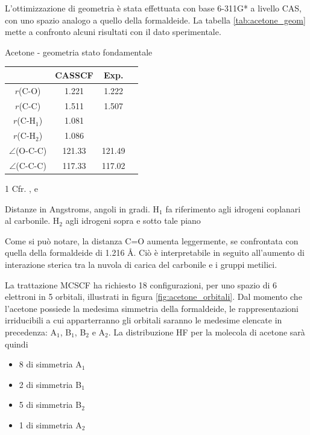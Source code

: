 L'ottimizzazione di geometria \`e stata effettuata con base 6-311G* a livello CAS,
con uno spazio analogo a quello della formaldeide. La tabella \ref{tab:acetone_geom}
mette a confronto alcuni risultati con il dato sperimentale.
\begin{center}
\begin{threeparttable}
\caption{Acetone - geometria stato fondamentale}
\label{tab:acetone_geom}
\small
\begin{tabular}{|ccc|c|}
\hline
							& CASSCF	& Exp.\tnote{1} \\ 
\hline
$r$(C-O)\tnote{2}			& 1.221		& 1.222				\\
$r$(C-C)\tnote{2}			& 1.511		& 1.507				 \\
$r$(C-H$_1$)\tnote{3}			& 1.081		&			 		 \\
$r$(C-H$_2$)\tnote{3}			& 1.086		&				 	 \\
$\angle$(O-C-C)				& 121.33	& 121.49			 \\
$\angle$(C-C-C)				& 117.33	& 117.02			 \\
\hline
\end{tabular}
\begin{tablenotes}
\parbox[h]{6cm}{
\small
 \item[1] Cfr. \cite{jms-550-551-2000-281}, \cite{jms-120-1986-118} e
 \cite{mp-31-1976-1377}
 \item[] Distanze in Angstroms, angoli in gradi. H$_1$ fa riferimento agli
         idrogeni coplanari al carbonile. H$_2$ agli idrogeni sopra e sotto tale
         piano
}
\end{tablenotes}
\end{threeparttable}
\end{center}
Come si pu\`o notare, la distanza C=O aumenta leggermente, se confrontata
con quella della formaldeide di 1.216 \AA. Ci\`o \`e interpretabile in seguito
all'aumento di interazione sterica tra la nuvola di carica del carbonile e i
gruppi metilici.

La trattazione MCSCF ha richiesto
18 configurazioni, per uno spazio di 6 elettroni in 5 orbitali, illustrati
in figura \ref{fig:acetone_orbitali}. Dal momento che l'acetone possiede la
medesima simmetria della formaldeide, le rappresentazioni irriducibili a cui
apparterranno gli orbitali saranno le medesime elencate in precedenza: A$_1$, B$_1$,
B$_2$ e A$_2$. La distribuzione HF per la molecola di acetone sar\`a quindi
\begin{itemize}
\item 8 di simmetria A$_1$
\item 2 di simmetria B$_1$
\item 5 di simmetria B$_2$
\item 1 di simmetria A$_2$
\end{itemize}

